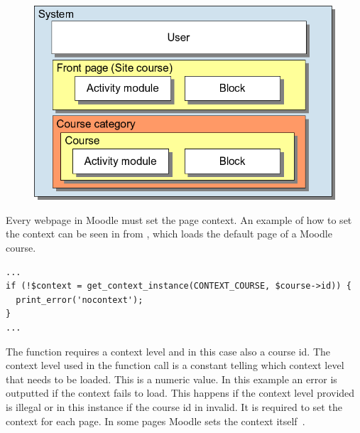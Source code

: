  \begin{figure}
	 \centering
		 \includegraphics[width=\textwidth]{images/moodle-contexts.png}
	 \label{fig:moodlecontexts}
 \end{figure}


Every webpage in Moodle must set the page context. 
An example of how to set the context can be seen in  from , which loads the default page of a Moodle course.

\begin{lstlisting}[style=phpCode, caption=\myCaption{Code snippet from \moodlefile{/course/view.php} showing how the context of a course is set}, label=courseviewcontextsnippet]
...
if (!$context = get_context_instance(CONTEXT_COURSE, $course->id)) {
  print_error('nocontext');
}
...
\end{lstlisting}
The function  requires a context level and in this case also a course id. 
The context level used in the function call is a constant telling which context level that needs to be loaded. 
This is a numeric value. 
In this example an error is outputted if the context fails to load. 
This happens if the context level provided is illegal or in this instance if the course id in invalid.
It is required to set the context for each page. 
In some pages Moodle sets the context itself~\cite{moodlepageapi}. 


